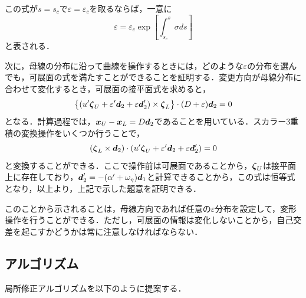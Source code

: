 \documentclass[16.7pt]{jsarticle}
\begin{document}
		この式が$ s = s_c $で$ \varepsilon=\varepsilon_c $を取るならば，一意に
		\begin{equation}\label{eq:vareq}
			\varepsilon = \varepsilon_c \exp \left[ \int_{s_c}^{s} \sigma ds \right]
		\end{equation}
		と表される．
		
		次に，母線の分布に沿って曲線を操作するときには，どのような$ \varepsilon $の分布を選んでも，可展面の式を満たすことができることを証明する．変更方向が母線分布に合わせて変化するとき，可展面の接平面式を求めると，
		\begin{equation}\label{eq:TanEq_withGene}
			\left\{ (u'\boldsymbol{\zeta}_U + \varepsilon' \boldsymbol{d}_2 + \varepsilon \boldsymbol{d}_2') \times \boldsymbol{\zeta}_L \right\}\cdot(D+\varepsilon)\boldsymbol{d}_2 = 0
		\end{equation}
		となる．計算過程では，$ \boldsymbol{x}_U - \boldsymbol{x}_L = D \boldsymbol{d}_2 $であることを用いている．スカラー3重積の変換操作をいくつか行うことで，
		\begin{equation}\label{eq:TanEq_ver2}
			(\boldsymbol{\zeta}_L \times \boldsymbol{d}_2 )\cdot (u'\boldsymbol{\zeta}_U + \varepsilon' \boldsymbol{d}_2 + \varepsilon \boldsymbol{d}_2') = 0
		\end{equation}
		と変換することができる．ここで操作前は可展面であることから，$ \boldsymbol{\zeta}_U $は接平面上に存在しており，$ \boldsymbol{d}_2' = -(\alpha' + \omega_{\eta}) \boldsymbol{d}_1 $と計算できることから，この式は恒等式となり，以上より，上記で示した題意を証明できる．
		
		このことから示されることは，母線方向であれば任意の$ \varepsilon $分布を設定して，変形操作を行うことができる．ただし，可展面の情報は変化しないことから，自己交差を起こすかどうかは常に注意しなければならない．
		
		\subsection{アルゴリズム}
		局所修正アルゴリズムを以下のように提案する．
		
\end{document}
